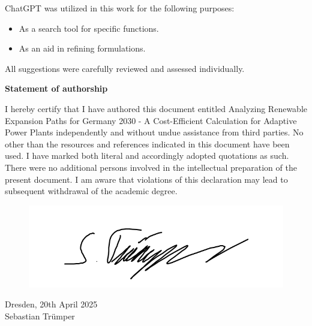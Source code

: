 ChatGPT was utilized in this work for the following purposes:
\begin{itemize}
	\item As a search tool for specific functions.
	\item As an aid in refining formulations.
\end{itemize}
All suggestions were carefully reviewed and assessed individually.



\begin{center}
	\textbf{Statement of authorship}
\end{center}

I hereby certify that I have authored this document entitled Analyzing Renewable Expansion
Paths for Germany 2030 - A Cost-Efficient Calculation for Adaptive Power Plants independently
and without undue assistance from third parties. No other than the resources and references
indicated in this document have been used. I have marked both literal and accordingly adopted
quotations as such. There were no additional persons involved in the intellectual preparation
of the present document. I am aware that violations of this declaration may lead to subsequent
withdrawal of the academic degree.\\

\begin{figure}[!h]
	\includegraphics[width=0.5\linewidth]{figures/unterschrift.png}
\end{figure}
Dresden, 20th April 2025\\
Sebastian Trümper\\